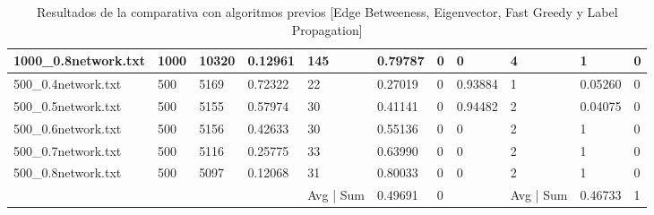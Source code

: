 \begin{sidewaystable}
\begin{tabular}{lllllllllll}
		\multicolumn{1}{|l|}{1000\_0.8network.txt} & \multicolumn{1}{l|}{1000} & \multicolumn{1}{l|}{10320} & \multicolumn{1}{l|}{0.12961} & \multicolumn{1}{l|}{145}   & \multicolumn{1}{l|}{0.79787} & \multicolumn{1}{l|}{0}       & \multicolumn{1}{l|}{0}       & \multicolumn{1}{l|}{4}     & \multicolumn{1}{l|}{1}       & \multicolumn{1}{l|}{0}       \\ \hline
		\multicolumn{1}{|l|}{500\_0.4network.txt}  & \multicolumn{1}{l|}{500}  & \multicolumn{1}{l|}{5169}  & \multicolumn{1}{l|}{0.72322} & \multicolumn{1}{l|}{22}    & \multicolumn{1}{l|}{0.27019} & \multicolumn{1}{l|}{0}       & \multicolumn{1}{l|}{0.93884} & \multicolumn{1}{l|}{1}     & \multicolumn{1}{l|}{0.05260} & \multicolumn{1}{l|}{0}       \\ \hline
		\multicolumn{1}{|l|}{500\_0.5network.txt}  & \multicolumn{1}{l|}{500}  & \multicolumn{1}{l|}{5155}  & \multicolumn{1}{l|}{0.57974} & \multicolumn{1}{l|}{30}    & \multicolumn{1}{l|}{0.41141} & \multicolumn{1}{l|}{0}       & \multicolumn{1}{l|}{0.94482} & \multicolumn{1}{l|}{2}     & \multicolumn{1}{l|}{0.04075} & \multicolumn{1}{l|}{0}       \\ \hline
		\multicolumn{1}{|l|}{500\_0.6network.txt}  & \multicolumn{1}{l|}{500}  & \multicolumn{1}{l|}{5156}  & \multicolumn{1}{l|}{0.42633} & \multicolumn{1}{l|}{30}    & \multicolumn{1}{l|}{0.55136} & \multicolumn{1}{l|}{0}       & \multicolumn{1}{l|}{0}       & \multicolumn{1}{l|}{2}     & \multicolumn{1}{l|}{1}       & \multicolumn{1}{l|}{0}       \\ \hline
		\multicolumn{1}{|l|}{500\_0.7network.txt}  & \multicolumn{1}{l|}{500}  & \multicolumn{1}{l|}{5116}  & \multicolumn{1}{l|}{0.25775} & \multicolumn{1}{l|}{33}    & \multicolumn{1}{l|}{0.63990} & \multicolumn{1}{l|}{0}       & \multicolumn{1}{l|}{0}       & \multicolumn{1}{l|}{2}     & \multicolumn{1}{l|}{1}       & \multicolumn{1}{l|}{0}       \\ \hline
		\multicolumn{1}{|l|}{500\_0.8network.txt}  & \multicolumn{1}{l|}{500}  & \multicolumn{1}{l|}{5097}  & \multicolumn{1}{l|}{0.12068} & \multicolumn{1}{l|}{31}    & \multicolumn{1}{l|}{0.80033} & \multicolumn{1}{l|}{0}       & \multicolumn{1}{l|}{0}       & \multicolumn{1}{l|}{2}     & \multicolumn{1}{l|}{1}       & \multicolumn{1}{l|}{0}       \\ \hline
		&                           &                            &                              &  Avg | Sum                          & 0.49691                      & 0                            &                              &  Avg | Sum                          & 0.46733                      & 1                           
	\end{tabular}
	\caption{Resultados de la comparativa con algoritmos previos [Edge Betweeness, Eigenvector, Fast Greedy y Label Propagation]}
\end{sidewaystable}